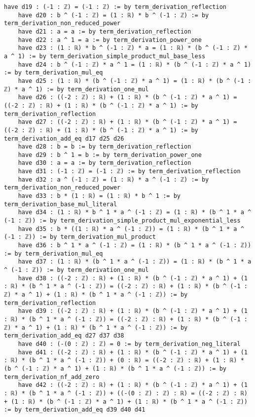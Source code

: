\documentclass{article}
\begin{document}
\begin{tcolorbox}[colback=white!10, width=\linewidth]
\begin{lstlisting}[language=Lean4]
    have d19 : (-1 : ℤ) = (-1 : ℤ) := by term_derivation_reflection
    have d20 : b ^ (-1 : ℤ) = (1 : ℝ) * b ^ (-1 : ℤ) := by term_derivation_non_reduced_power
    have d21 : a = a := by term_derivation_reflection
    have d22 : a ^ 1 = a := by term_derivation_power_one
    have d23 : (1 : ℝ) * b ^ (-1 : ℤ) * a = (1 : ℝ) * (b ^ (-1 : ℤ) * a ^ 1) := by term_derivation_simple_product_mul_base_less
    have d24 : b ^ (-1 : ℤ) * a ^ 1 = (1 : ℝ) * (b ^ (-1 : ℤ) * a ^ 1) := by term_derivation_mul_eq
    have d25 : (1 : ℝ) * (b ^ (-1 : ℤ) * a ^ 1) = (1 : ℝ) * (b ^ (-1 : ℤ) * a ^ 1) := by term_derivation_one_mul
    have d26 : ((-2 : ℤ) : ℝ) + (1 : ℝ) * (b ^ (-1 : ℤ) * a ^ 1) = ((-2 : ℤ) : ℝ) + (1 : ℝ) * (b ^ (-1 : ℤ) * a ^ 1) := by term_derivation_reflection
    have d27 : ((-2 : ℤ) : ℝ) + (1 : ℝ) * (b ^ (-1 : ℤ) * a ^ 1) = ((-2 : ℤ) : ℝ) + (1 : ℝ) * (b ^ (-1 : ℤ) * a ^ 1) := by term_derivation_add_eq d17 d25 d26
    have d28 : b = b := by term_derivation_reflection
    have d29 : b ^ 1 = b := by term_derivation_power_one
    have d30 : a = a := by term_derivation_reflection
    have d31 : (-1 : ℤ) = (-1 : ℤ) := by term_derivation_reflection
    have d32 : a ^ (-1 : ℤ) = (1 : ℝ) * a ^ (-1 : ℤ) := by term_derivation_non_reduced_power
    have d33 : b * (1 : ℝ) = (1 : ℝ) * b ^ 1 := by term_derivation_base_mul_literal
    have d34 : (1 : ℝ) * b ^ 1 * a ^ (-1 : ℤ) = (1 : ℝ) * (b ^ 1 * a ^ (-1 : ℤ)) := by term_derivation_simple_product_mul_exponential_less
    have d35 : b * ((1 : ℝ) * a ^ (-1 : ℤ)) = (1 : ℝ) * (b ^ 1 * a ^ (-1 : ℤ)) := by term_derivation_mul_product
    have d36 : b ^ 1 * a ^ (-1 : ℤ) = (1 : ℝ) * (b ^ 1 * a ^ (-1 : ℤ)) := by term_derivation_mul_eq
    have d37 : (1 : ℝ) * (b ^ 1 * a ^ (-1 : ℤ)) = (1 : ℝ) * (b ^ 1 * a ^ (-1 : ℤ)) := by term_derivation_one_mul
    have d38 : ((-2 : ℤ) : ℝ) + (1 : ℝ) * (b ^ (-1 : ℤ) * a ^ 1) + (1 : ℝ) * (b ^ 1 * a ^ (-1 : ℤ)) = ((-2 : ℤ) : ℝ) + (1 : ℝ) * (b ^ (-1 : ℤ) * a ^ 1) + (1 : ℝ) * (b ^ 1 * a ^ (-1 : ℤ)) := by term_derivation_reflection
    have d39 : ((-2 : ℤ) : ℝ) + (1 : ℝ) * (b ^ (-1 : ℤ) * a ^ 1) + (1 : ℝ) * (b ^ 1 * a ^ (-1 : ℤ)) = ((-2 : ℤ) : ℝ) + (1 : ℝ) * (b ^ (-1 : ℤ) * a ^ 1) + (1 : ℝ) * (b ^ 1 * a ^ (-1 : ℤ)) := by term_derivation_add_eq d27 d37 d38
    have d40 : (-(0 : ℤ) : ℤ) = 0 := by term_derivation_neg_literal
    have d41 : ((-2 : ℤ) : ℝ) + (1 : ℝ) * (b ^ (-1 : ℤ) * a ^ 1) + (1 : ℝ) * (b ^ 1 * a ^ (-1 : ℤ)) + (0 : ℝ) = ((-2 : ℤ) : ℝ) + (1 : ℝ) * (b ^ (-1 : ℤ) * a ^ 1) + (1 : ℝ) * (b ^ 1 * a ^ (-1 : ℤ)) := by term_derivation_nf_add_zero
    have d42 : ((-2 : ℤ) : ℝ) + (1 : ℝ) * (b ^ (-1 : ℤ) * a ^ 1) + (1 : ℝ) * (b ^ 1 * a ^ (-1 : ℤ)) + ((-(0 : ℤ) : ℤ) : ℝ) = ((-2 : ℤ) : ℝ) + (1 : ℝ) * (b ^ (-1 : ℤ) * a ^ 1) + (1 : ℝ) * (b ^ 1 * a ^ (-1 : ℤ)) := by term_derivation_add_eq d39 d40 d41

\end{lstlisting}
\end{tcolorbox}
\end{document}
